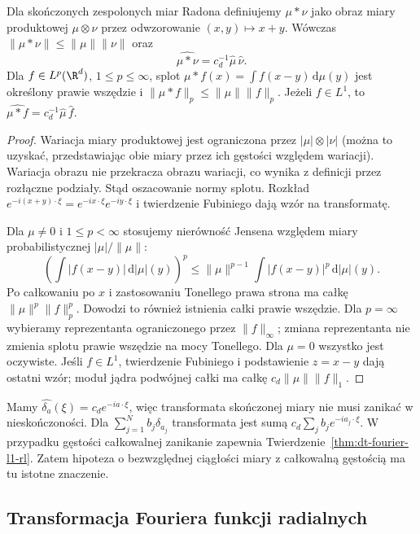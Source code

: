 \begin{stwierdzenie}
\label{prop:dt-fourier-measure-conv}
Dla skończonych zespolonych miar Radona definiujemy
$\mu*\nu$ jako obraz miary produktowej $\mu\otimes\nu$
przez odwzorowanie $(x,y)\mapsto x+y$. Wówczas
$\|\mu*\nu\|\le\|\mu\|\|\nu\|$ oraz
\[
 \widehat{\mu*\nu}=c_d^{-1}\widehat\mu\,\widehat\nu.
\]
Dla $f\in L^p(\R^d)$, $1\le p\le\infty$, splot
$\mu*f(x)=\int f(x-y)\,\mathrm d\mu(y)$ jest określony
prawie wszędzie i $\|\mu*f\|_p\le\|\mu\|\|f\|_p$.
Jeżeli $f\in L^1$, to
$\widehat{\mu*f}=c_d^{-1}\widehat\mu\,\widehat f$.
\end{stwierdzenie}
\begin{proof}
Wariacja miary produktowej jest ograniczona przez
$|\mu|\otimes|\nu|$ (można to uzyskać, przedstawiając
obie miary przez ich gęstości względem wariacji).
Wariacja obrazu nie przekracza obrazu wariacji, co
wynika z definicji przez rozłączne podziały.
Stąd oszacowanie normy splotu.
Rozkład $e^{-i(x+y)\cdot\xi}=e^{-ix\cdot\xi}e^{-iy\cdot\xi}$
i twierdzenie Fubiniego dają wzór na transformatę.

Dla $\mu\ne0$ i $1\le p<\infty$ stosujemy nierówność
Jensena względem miary probabilistycznej $|\mu|/\|\mu\|$:
\[
 \left(\int|f(x-y)|\,\mathrm d|\mu|(y)\right)^p
 \le \|\mu\|^{p-1}\int|f(x-y)|^p\,\mathrm d|\mu|(y).
\]
Po całkowaniu po $x$ i zastosowaniu Tonellego prawa strona
ma całkę $\|\mu\|^p\|f\|_p^p$. Dowodzi to również istnienia
całki prawie wszędzie. Dla $p=\infty$ wybieramy
reprezentanta ograniczonego przez $\|f\|_\infty$;
zmiana reprezentanta nie zmienia splotu prawie wszędzie
na mocy Tonellego. Dla $\mu=0$ wszystko jest oczywiste.
Jeśli $f\in L^1$, twierdzenie Fubiniego i podstawienie
$z=x-y$ dają ostatni wzór; moduł jądra podwójnej całki
ma całkę $c_d\|\mu\|\|f\|_1$.
\end{proof}

\begin{przyklad}
\label{ex:dt-fourier-measure-atoms}
Mamy $\widehat{\delta_a}(\xi)=c_de^{-ia\cdot\xi}$,
więc transformata skończonej miary nie musi zanikać
w nieskończoności. Dla $\sum_{j=1}^N b_j\delta_{a_j}$
transformata jest sumą $c_d\sum_j b_je^{-ia_j\cdot\xi}$.
W przypadku gęstości całkowalnej zanikanie zapewnia
Twierdzenie~\ref{thm:dt-fourier-l1-rl}. Zatem hipoteza
o bezwzględnej ciągłości miary z całkowalną gęstością
ma tu istotne znaczenie.
\end{przyklad}

\subsection{Transformacja Fouriera funkcji radialnych}

